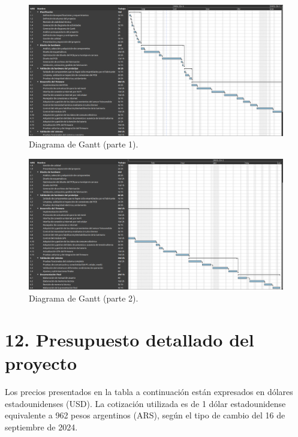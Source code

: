 \documentclass[
11pt, %
]{charter}
\begin{document}
\begin{landscape}
\begin{figure}[htpb]
\centering 
\includegraphics[height=.8\textheight]{./Figuras/Gantt-1.png}
\caption{Diagrama de Gantt (parte 1).} %
\label{fig:diagGantt-1}
\end{figure}
\end{landscape}

\begin{landscape}
\begin{figure}[htpb]
\centering 
\includegraphics[height=.8\textheight]{./Figuras/Gantt-2.png}
\caption{Diagrama de Gantt (parte 2).} %
\label{fig:diagGantt-2}
\end{figure}
\end{landscape}


\section{12. Presupuesto detallado del proyecto}
\label{sec:presupuesto}

Los precios presentados en la tabla a continuación están expresados en dólares estadounidenses (USD). La cotización utilizada es de 1 dólar estadounidense equivalente a 962 pesos argentinos (ARS), según el tipo de cambio del 16 de septiembre de 2024.
\end{document}
